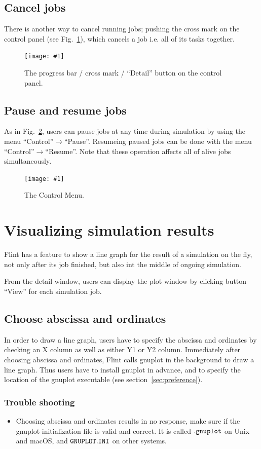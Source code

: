 \documentclass[a4paper,10pt]{report}
\newcommand\FigureOfImage[2]{\begin{figure}[h]
  \centering
  \texttt{[image: \#1]}
  \caption{#2}\label{fig:#1}
\end{figure}}
\begin{document}
\subsection{Cancel jobs}
There is another way to cancel running jobs; pushing the cross mark on the
control panel (see Fig.~\ref{fig:lr-progress}), which cancels a job i.e. all
of its tasks together.
\FigureOfImage{lr-progress}{The progress bar / cross mark / ``Detail'' button on
 the control panel.}

\subsection{Pause and resume jobs}
As in Fig.~\ref{fig:control}, users can pause jobs at any time during simulation
by using the menu ``Control''$\rightarrow$``Pause''. Resumeing paused jobs can
be done with the menu ``Control''$\rightarrow$``Resume''.
Note that these operation affects all of alive jobs simultaneously.
\FigureOfImage{control}{The Control Menu.}

\section{Visualizing simulation results}
Flint has a feature to show a line graph for the result of a simulation on the
fly, not only after its job finished, but also int the middle of ongoing
simulation.

From the detail window, users can display the plot window by clicking button
``View'' for each simulation job.

\subsection{Choose abscissa and ordinates}
In order to draw a line graph, users have to specify the abscissa and ordinates
by checking an X column as well as either Y1 or Y2 column.
Immediately after choosing abscissa and ordinates, Flint calls gnuplot in the
background to draw a line graph.
Thus users have to install gnuplot in advance, and to specify the location of
the gnuplot executable (see section~\ref{sec:preference}).

\subsubsection{Trouble shooting}
\begin{itemize}
\item Choosing abscissa and ordinates results in no response, make sure if the
  gnuplot initialization file is valid and correct.
  It is called $\tt{.gnuplot}$ on Unix and macOS, and $\tt{GNUPLOT.INI}$ on
  other systems.
\end{itemize}
\end{document}
